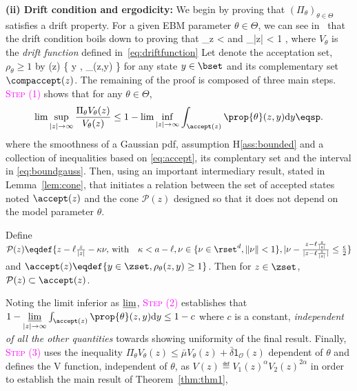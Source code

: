 \documentclass{article} %
\begin{document}
\medskip
\noindent \textbf{(ii) Drift condition and ergodicity: }
We begin by proving that $(\Pi_\theta)_{\theta \in \Theta}$ satisfies a drift property.
For a given EBM parameter $\theta \in \Theta$, we can see in~\citet{jarner2000geometric} that the drift condition boils down to proving that
\beq\notag
\sup \limits_{z \in \zset}   < \infty \quad \textrm{and} \quad \lim \sup \limits_{|z| \to \infty}   < 1 \eqsp,
\eeq
where $V_\theta$ is the \emph{drift function} defined in~\eqref{eq:driftfunction}
Let denote the acceptation set, \ie\ $\rho_\theta \geq 1$ by 
\beq\label{eq:accept}
\accept(z) \eqdef \{ y \in \zset, \rho_\theta(z,y)  \}
\eeq
for any state $y \in \bset$ and its complementary set $\compaccept(z)$.
The remaining of the proof is composed of three main steps. 
\textcolor{magenta}{\textsc{Step (1)}} shows that for any $\theta \in \Theta$,
\begin{align}\notag
\lim \sup \limits_{|z| \to \infty}  \frac{\Pi_\theta V_\theta(z)}{V_\theta(z)} \leq 1 - \lim \inf \limits_{|z| \to \infty}  \int_{\accept(z)} \prop{\theta}(z,y)  \textrm{d}y \eqsp.
\end{align}
where the smoothness of a Gaussian pdf, assumption H\ref{ass:bounded} and a collection of inequalities based on \eqref{eq:accept}, its complentary set and the interval in \eqref{eq:boundgauss}.
Then, using an important intermediary result, stated in Lemma~\ref{lem:cone}, that initiates a relation between the set of accepted states noted $\accept(z)$ and the cone $\mathcal{P}(z)$ designed so that it does not depend on the model parameter $\theta$. 
\begin{lemm}\label{lem:cone}
Define $\mathcal{P}(z) \eqdef \{ z- \ell \frac{z}{|z|} - \kappa \nu , \, \textrm{with} \quad \kappa < a - \ell  , \nu \in \{ \nu \in \rset^d, \| \nu \| < 1\}, |\nu - \frac{z- \ell \frac{z}{|z|} }{|z- \ell \frac{z}{|z|} |} \leq \frac{\epsilon}{2}   \}$ and $\accept(z) \eqdef \{ y \in \zset, \rho_\theta(z,y) \geq 1 \}$. Then for $z \in \zset$, $\mathcal{P}(z) \subset \accept(z)$.
\end{lemm}
Noting the limit inferior as $\varliminf$, 
\textcolor{magenta}{\textsc{Step (2)}} establishes that $1 - \varliminf \limits_{|z| \to \infty}  \int_{\accept(z)} \prop{\theta}(z,y)  \textrm{d}y \leq 1 - c$ where $c$ is a constant, \emph{independent of all the other quantities} towards showing uniformity of the final result.
Finally, 
\textcolor{magenta}{\textsc{Step (3)}} uses the inequality $\Pi_\theta V_\theta(z) \leq \bar{\mu} V_\theta(z) + \bar{\delta} \mathsf{1}_{\mathcal{O}}(z)$ dependent of $\theta$ and defines the V function, independent of $\theta$, as $V(z) \eqdef V_1(z)^\alpha V_2(z)^{2\alpha}$ in order to establish the main result of Theorem~\ref{thm:thm1}, \ie
\end{document}
